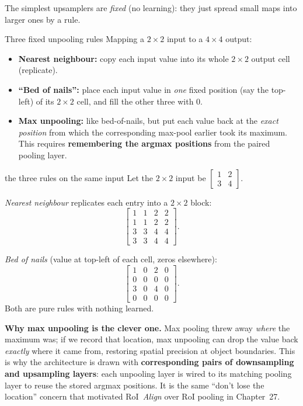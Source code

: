 \documentclass{report}
\begin{document}
The simplest upsamplers are \emph{fixed} (no learning): they just spread small
maps into larger ones by a rule.

\begin{defbox}{Three fixed unpooling rules}
Mapping a $2\times2$ input to a $4\times4$ output:
\begin{itemize}
\item \textbf{Nearest neighbour:} copy each input value into its whole
$2\times2$ output cell (replicate).
\item \textbf{``Bed of nails'':} place each input value in \emph{one} fixed
position (say the top-left) of its $2\times2$ cell, and fill the other three
with $0$.
\item \textbf{Max unpooling:} like bed-of-nails, but put each value back at the
\emph{exact position} from which the corresponding max-pool earlier took its
maximum. This requires \textbf{remembering the argmax positions} from the paired
pooling layer.
\end{itemize}
\end{defbox}

\begin{exbox}{the three rules on the same input}
Let the $2\times2$ input be
$\begin{bmatrix} 1 & 2 \\ 3 & 4 \end{bmatrix}$.

\emph{Nearest neighbour} replicates each entry into a $2\times2$ block:
\[
\begin{bmatrix}
1 & 1 & 2 & 2 \\
1 & 1 & 2 & 2 \\
3 & 3 & 4 & 4 \\
3 & 3 & 4 & 4
\end{bmatrix}.
\]

\emph{Bed of nails} (value at top-left of each cell, zeros elsewhere):
\[
\begin{bmatrix}
1 & 0 & 2 & 0 \\
0 & 0 & 0 & 0 \\
3 & 0 & 4 & 0 \\
0 & 0 & 0 & 0
\end{bmatrix}.
\]
Both are pure rules with nothing learned.
\end{exbox}

\begin{keybox}
\textbf{Why max unpooling is the clever one.} Max pooling threw away \emph{where}
the maximum was; if we record that location, max unpooling can drop the value
back \emph{exactly} where it came from, restoring spatial precision at object
boundaries. This is why the architecture is drawn with \textbf{corresponding
pairs of downsampling and upsampling layers}: each unpooling layer is wired to
its matching pooling layer to reuse the stored argmax positions. It is the same
``don't lose the location'' concern that motivated RoI~\emph{Align} over RoI
pooling in Chapter~27.
\end{keybox}
\end{document}
